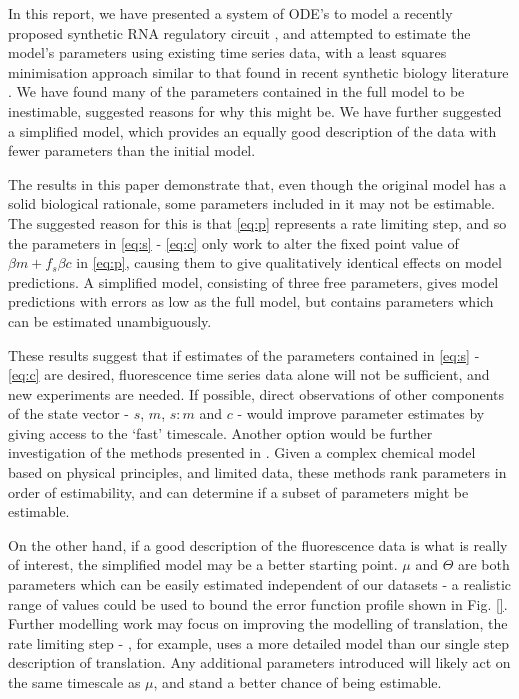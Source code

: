 \documentclass[10pt,journal]{./IEEE_latex_class/IEEEtran}
\begin{document}
In this report, we have presented a system of ODE's to model a recently proposed synthetic RNA regulatory circuit \cite{Rodrigo2012}, and attempted to estimate the model's parameters using existing time series data, with a least squares minimisation approach similar to that found in recent synthetic biology literature \cite{Hu2015}. We have found many of the parameters contained in the full model to be inestimable, suggested reasons  for why this might be. We have further suggested a simplified model, which provides an equally good description of the data with fewer parameters than the initial model.

The results in this paper demonstrate that, even though the original model has a solid biological rationale, some parameters included in it may not be estimable. The suggested reason for this is that \eqref{eq:p} represents a rate limiting step, and so the parameters in \eqref{eq:s} - \eqref{eq:c} only work to alter the fixed point value of $\beta m +f_{s}\beta c$ in \eqref{eq:p}, causing them to give qualitatively identical effects on model predictions. A simplified model, consisting of three free parameters, gives model predictions with errors as low as the full model, but contains parameters which can be estimated unambiguously.

These results suggest that if estimates of the parameters contained in \eqref{eq:s} - \eqref{eq:c} are desired, fluorescence time series data alone will not be sufficient, and new experiments are needed. If possible, direct observations of other components of the state vector - $s$, $m$, $s:m$ and $c$ - would improve parameter estimates by giving access to the `fast' timescale. Another option would be further investigation of the methods presented in \cite{Mclean2012,Yao2003,Mclean2012-2}. Given a complex chemical model based on physical principles, and limited data, these methods rank parameters in order of estimability, and can determine if a subset of parameters might be estimable.

On the other hand, if a good description of the fluorescence data is what is really of interest, the simplified model may be a better starting point. $\mu$ and $\Theta$ are both parameters which can be easily estimated independent of our datasets - a realistic range of values could be used to bound the error function profile shown in Fig. \ref{}. Further modelling work may focus on improving the modelling of translation, the rate limiting step - \cite{Hu2015}, for example, uses a more detailed model than our single step description of translation. Any additional parameters introduced will likely act on the same timescale as $\mu$, and stand a better chance of being estimable.
\end{document}
